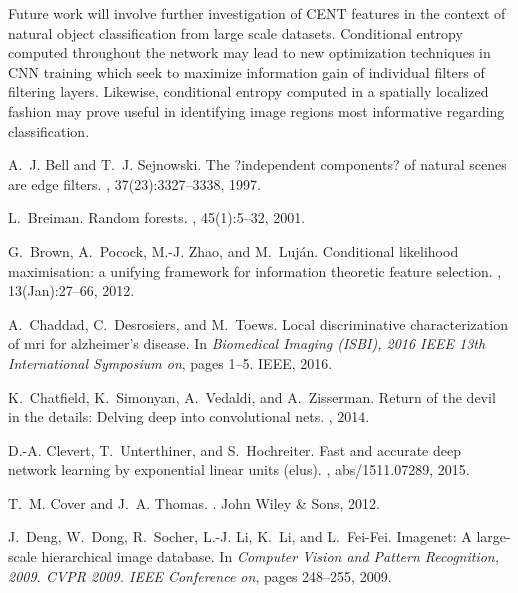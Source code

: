 \documentclass[10pt,onecolumn]{article}
\begin{document}
Future work will involve further investigation of CENT features in the context of natural object classification from large scale datasets. Conditional entropy computed throughout the network may lead to new optimization techniques in CNN training which seek to maximize information gain of individual filters of filtering layers. Likewise, conditional entropy computed in a spatially localized fashion may prove useful in identifying image regions most informative regarding classification.

\begin{thebibliography}{10}\itemsep=-1pt

A.~J. Bell and T.~J. Sejnowski.
\newblock The ?independent components? of natural scenes are edge filters.
, 37(23):3327--3338, 1997.

L.~Breiman.
\newblock Random forests.
, 45(1):5--32, 2001.

G.~Brown, A.~Pocock, M.-J. Zhao, and M.~Luj{\'a}n.
\newblock Conditional likelihood maximisation: a unifying framework for
  information theoretic feature selection.
, 13(Jan):27--66, 2012.

A.~Chaddad, C.~Desrosiers, and M.~Toews.
\newblock Local discriminative characterization of mri for alzheimer's disease.
\newblock In {\em Biomedical Imaging (ISBI), 2016 IEEE 13th International
  Symposium on}, pages 1--5. IEEE, 2016.

K.~Chatfield, K.~Simonyan, A.~Vedaldi, and A.~Zisserman.
\newblock Return of the devil in the details: Delving deep into convolutional
  nets.
, 2014.

D.-A. Clevert, T.~Unterthiner, and S.~Hochreiter.
\newblock Fast and accurate deep network learning by exponential linear units
  (elus).
, abs/1511.07289, 2015.

T.~M. Cover and J.~A. Thomas.
.
\newblock John Wiley \& Sons, 2012.

J.~Deng, W.~Dong, R.~Socher, L.-J. Li, K.~Li, and L.~Fei-Fei.
\newblock Imagenet: A large-scale hierarchical image database.
\newblock In {\em Computer Vision and Pattern Recognition, 2009. CVPR 2009.
  IEEE Conference on}, pages 248--255, 2009.


\end{thebibliography}
\end{document}
